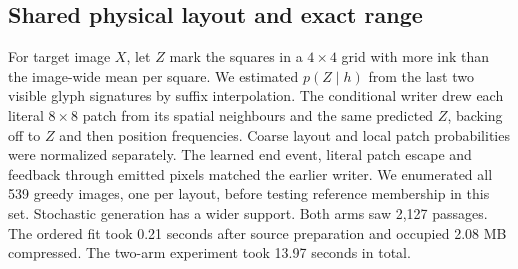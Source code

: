 \subsection*{Shared physical layout and exact range}
For target image $X$, let $Z$ mark the squares in a $4\times4$ grid with more
ink than the image-wide mean per square. We estimated $p(Z\mid h)$ from the
last two visible glyph signatures by suffix interpolation. The conditional
writer drew each literal $8\times8$ patch from its spatial neighbours and
the same predicted $Z$, backing off to $Z$ and then position frequencies.
Coarse layout and local patch probabilities were normalized separately.
The learned end event, literal patch escape and feedback through emitted
pixels matched the earlier writer. We enumerated all 539 greedy images,
one per layout, before testing reference membership in this set.
Stochastic generation has a wider support. Both arms saw 2,127 passages.
The ordered fit took 0.21 seconds after source preparation and occupied
2.08 MB compressed. The two-arm experiment took 13.97 seconds in total.
